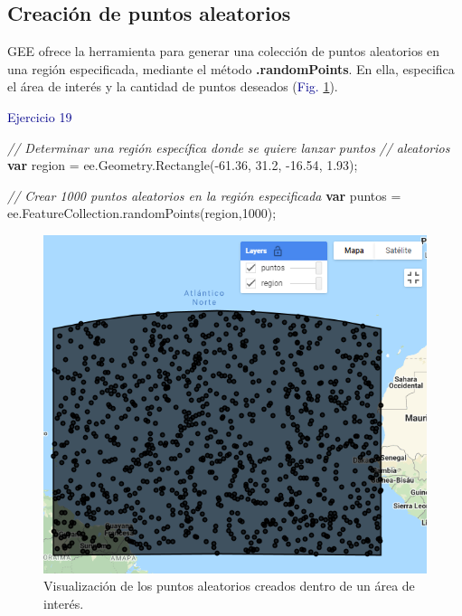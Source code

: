 \documentclass[
  12pt,
  letterpaper,
  twoside]{book}
\newenvironment{Shaded}{\begin{snugshade}}{\end{snugshade}}
\newcommand{\AttributeTok}[1]{\textcolor[rgb]{0.48,0.12,0.64}{#1}}
\newcommand{\CommentTok}[1]{\textcolor[rgb]{0.24,0.58,0.00}{\textit{#1}}}
\newcommand{\ControlFlowTok}[1]{\textcolor[rgb]{0.00,0.00,0.00}{\textbf{#1}}}
\newcommand{\DecValTok}[1]{\textcolor[rgb]{0.28,0.53,0.93}{#1}}
\newcommand{\FloatTok}[1]{\textcolor[rgb]{0.28,0.53,0.93}{#1}}
\newcommand{\FunctionTok}[1]{\textcolor[rgb]{0.48,0.12,0.64}{#1}}
\newcommand{\KeywordTok}[1]{\textcolor[rgb]{0.48,0.12,0.64}{#1}}
\newcommand{\NormalTok}[1]{#1}
\newcommand{\OperatorTok}[1]{\textcolor[rgb]{0.00,0.00,0.00}{#1}}
\newcommand\boldpurple[1]{\textcolor{darkpurple}{\textbf{#1}}}
\begin{document}
\hypertarget{creaciuxf3n-de-puntos-aleatorios}{%
\subsection*{Creación de puntos aleatorios}\label{creaciuxf3n-de-puntos-aleatorios}}

GEE ofrece la herramienta para generar una colección de puntos aleatorios en una región especificada, mediante el método \boldpurple{.randomPoints}. En ella, especifica el área de interés y la cantidad de puntos deseados (\textcolor{darkblue}{Fig.} \ref{fig:f87}).

\textcolor{darkblue}{Ejercicio 19}

\begin{Shaded}
\begin{Highlighting}[]
\CommentTok{// Determinar una región específica donde se quiere lanzar puntos }
\CommentTok{// aleatorios}
\ControlFlowTok{var}\NormalTok{ region }\OperatorTok{=} \KeywordTok{ee}\OperatorTok{.}\AttributeTok{Geometry}\OperatorTok{.}\FunctionTok{Rectangle}\NormalTok{(}\OperatorTok{{-}}\FloatTok{61.36}\OperatorTok{,} \FloatTok{31.2}\OperatorTok{,} \OperatorTok{{-}}\FloatTok{16.54}\OperatorTok{,} \FloatTok{1.93}\NormalTok{)}\OperatorTok{;}

\CommentTok{// Crear 1000 puntos aleatorios en la región especificada}
\ControlFlowTok{var}\NormalTok{ puntos }\OperatorTok{=} \KeywordTok{ee}\OperatorTok{.}\AttributeTok{FeatureCollection}\OperatorTok{.}\FunctionTok{randomPoints}\NormalTok{(region}\OperatorTok{,}\DecValTok{1000}\NormalTok{)}\OperatorTok{;}
\end{Highlighting}
\end{Shaded}

\begin{figure}[H]

{\centering \includegraphics[width=0.95\linewidth]{Img/ej19} 

}

\caption{Visualización de los puntos aleatorios creados dentro de un área de interés.}\label{fig:f87}
\end{figure}
\end{document}
